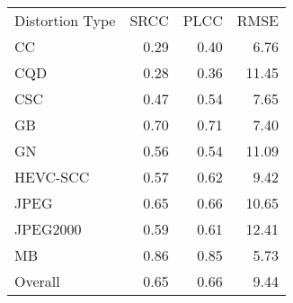 \begin{tabular}{lrrr}
Distortion Type & SRCC & PLCC & RMSE \\
CC & 0.29 & 0.40 & 6.76 \\
CQD & 0.28 & 0.36 & 11.45 \\
CSC & 0.47 & 0.54 & 7.65 \\
GB & 0.70 & 0.71 & 7.40 \\
GN & 0.56 & 0.54 & 11.09 \\
HEVC-SCC & 0.57 & 0.62 & 9.42 \\
JPEG & 0.65 & 0.66 & 10.65 \\
JPEG2000 & 0.59 & 0.61 & 12.41 \\
MB & 0.86 & 0.85 & 5.73 \\
Overall & 0.65 & 0.66 & 9.44 \\
\end{tabular}
